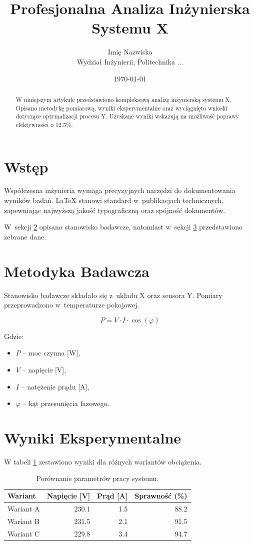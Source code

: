 \documentclass[11pt,a4paper,oneside]{article}
\title{Profesjonalna Analiza Inżynierska Systemu X}
\author{Imię Nazwisko \\ \small Wydział Inżynierii, Politechnika ...}
\date{\today}
\begin{document}
\maketitle

\begin{abstract}
W niniejszym artykule przedstawiono kompleksową analizę inżynierską systemu X. Opisano metodykę pomiarową, wyniki eksperymentalne oraz wyciągnięto wnioski dotyczące optymalizacji procesu Y. Uzyskane wyniki wskazują na możliwość poprawy efektywności o \num{12.5}\%.
\end{abstract}

\section{Wstęp}
Współczesna inżynieria wymaga precyzyjnych narzędzi do dokumentowania wyników badań. LaTeX stanowi standard w~publikacjach technicznych, zapewniając najwyższą jakość typograficzną oraz spójność dokumentów.

W~sekcji \ref{sec:metodyka} opisano stanowisko badawcze, natomiast w~sekcji \ref{sec:wyniki} przedstawiono zebrane dane.

\section{Metodyka Badawcza}
\label{sec:metodyka}
Stanowisko badawcze składało się z~układu X oraz sensora Y. Pomiary przeprowadzono w~temperaturze pokojowej.

\begin{equation}
    P = V \cdot I \cdot \cos(\varphi)
\end{equation}

Gdzie:
\begin{itemize}
    \item $P$ -- moc czynna [W],
    \item $V$ -- napięcie [V],
    \item $I$ -- natężenie prądu [A],
    \item $\varphi$ -- kąt przesunięcia fazowego.
\end{itemize}

\section{Wyniki Eksperymentalne}
\label{sec:wyniki}
W tabeli \ref{tab:wyniki} zestawiono wyniki dla różnych wariantów obciążenia.

\begin{table}[H]
    \centering
    \caption{Porównanie parametrów pracy systemu.}
    \label{tab:wyniki}
    \begin{tabular}{lrrr}
        \toprule
        Wariant & Napięcie [V] & Prąd [A] & Sprawność (\%) \\
        \midrule
        Wariant A & \num{230.1} & \num{1.5} & \num{88.2} \\
        Wariant B & \num{231.5} & \num{2.1} & \num{91.5} \\
        Wariant C & \num{229.8} & \num{3.4} & \num{94.7} \\
        \bottomrule
    \end{tabular}
\end{table}
\end{document}
